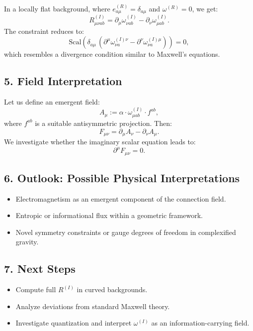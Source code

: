 In a locally flat background, where $e^{(R)}_{a\mu} = \delta_{a\mu}$ and $\omega^{(R)} = 0$, we get:
\[
R^{(I)}_{\mu\nu ab} = \partial_\mu \omega^{(I)}_{\nu ab} - \partial_\nu \omega^{(I)}_{\mu ab}.
\]
The constraint reduces to:
\[
\text{Scal}\left( \delta_{a\mu} \, (\partial^\mu \omega^{(I)\nu}_{\nu a} - \partial^\nu \omega^{(I)\mu}_{\nu a}) \right) = 0,
\]
which resembles a divergence condition similar to Maxwell’s equations.

\subsection*{5. Field Interpretation}

Let us define an emergent field:
\[
A_\mu := \alpha \cdot \omega^{(I)}_{\mu ab} \cdot f^{ab},
\]
where $f^{ab}$ is a suitable antisymmetric projection. Then:
\[
F_{\mu\nu} = \partial_\mu A_\nu - \partial_\nu A_\mu.
\]
We investigate whether the imaginary scalar equation leads to:
\[
\partial^\mu F_{\mu\nu} = 0.
\]

\subsection*{6. Outlook: Possible Physical Interpretations}

\begin{itemize}
  \item Electromagnetism as an emergent component of the connection field.
  \item Entropic or informational flux within a geometric framework.
  \item Novel symmetry constraints or gauge degrees of freedom in complexified gravity.
\end{itemize}

\subsection*{7. Next Steps}

\begin{itemize}
  \item Compute full $R^{(I)}$ in curved backgrounds.
  \item Analyze deviations from standard Maxwell theory.
  \item Investigate quantization and interpret $\omega^{(I)}$ as an information-carrying field.
\end{itemize}
